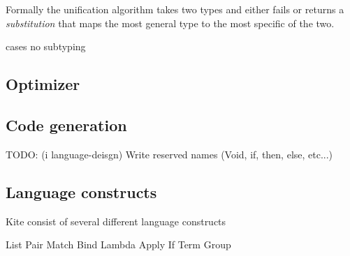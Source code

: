 Formally the unification algorithm takes two types and either fails or returns a \emph{substitution} that maps the most general type to the most specific of the two.


cases
no subtyping



\subsection{Optimizer}
\subsection{Code generation}

TODO: (i language-deisgn) Write reserved names (Void, if, then, else, etc...)

\subsection{Language constructs}

Kite consist of several different language constructs

List
Pair
Match
Bind
Lambda
Apply
If
Term
Group


